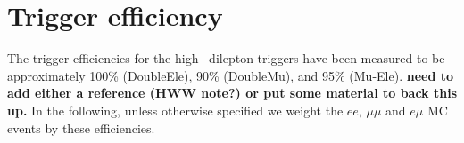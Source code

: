 \section{Trigger efficiency}
\label{sec:trgEff}

The trigger efficiencies for the high \pt\ dilepton triggers have been measured to be approximately
100\% (DoubleEle), 90\% (DoubleMu), and 95\% (Mu-Ele). 
{\bf need to add either a reference (HWW note?) or put some material to back this up.}
In the following, unless otherwise specified we weight the $ee$, $\mu\mu$ and $e\mu$ MC events 
by these efficiencies.
